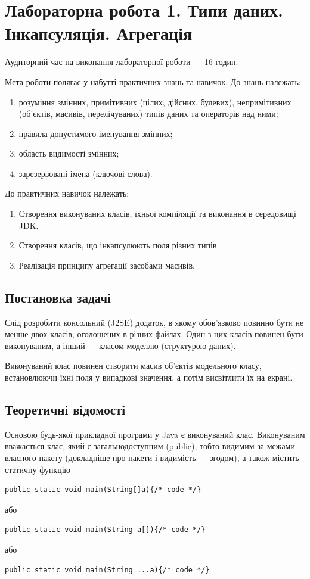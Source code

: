 \section{Лабораторна робота 1. Типи даних. Інкапсуляція. Агрегація}
 

Аудиторний час на виконання лабораторної роботи --- 16 годин.

Мета роботи полягає у набутті практичних знань та навичок. 
До знань належать:
\begin{enumerate}
\item розуміння змінних, примітивних (цілих, дійсних, булевих), непримітивних (об’єктів, масивів, перелічуваних) типів даних та операторів над ними;
\item правила допустимого іменування змінних;
\item область видимості змінних;
\item зарезервовані імена (ключові слова). 
\end{enumerate}

До практичних навичок належать:
\begin{enumerate}
\item Створення виконуваних класів, їхньої компіляції та виконання в середовищі JDK.
\item Створення класів, що інкапсулюють поля різних типів.
\item Реалізація принципу агрегації засобами масивів.
\end{enumerate}

\subsection{Постановка задачі}
Слід розробити консольний (J2SE) додаток, в якому обов’язково повинно бути не менше двох класів, оголошених в різних файлах. Один з цих класів повинен бути виконуваним, а інший --- класом-моделлю (структурою даних).

Виконуваний клас повинен створити масив об’єктів модельного класу, встановлюючи їхні поля у випадкові значення, а потім висвітлити їх на екрані.

\subsection{Теоретичні відомості}
Основою будь-якої прикладної програми у Java є виконуваний клас. Виконуваним вважається клас, який є загальнодоступним (public), тобто видимим за межами власного пакету (докладніше про пакети і видимість --- згодом), а також містить статичну функцію
\begin{lstlisting}
public static void main(String[]a){/* code */}
\end{lstlisting}
або
\begin{lstlisting}
public static void main(String a[]){/* code */}
\end{lstlisting}
або
\begin{lstlisting}
public static void main(String ...a){/* code */}
\end{lstlisting}

